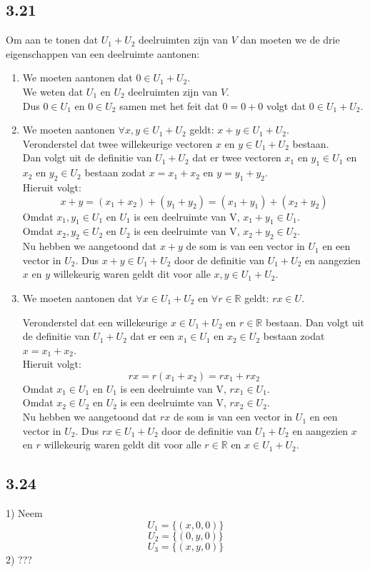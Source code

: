 \documentclass[lineaire_algebra_oplossingen.tex]{subfiles}
\begin{document}
\subsection*{3.21}
Om aan te tonen dat $U_1 + U_2$ deelruimten zijn van $V$ dan moeten we de drie eigenschappen van een deelruimte aantonen:
\begin{enumerate}
\item We moeten aantonen dat $0 \in U_1 + U_2$.\\
We weten dat $U_1$ en $U_2$ deelruimten zijn van $V$.\\
Dus $0 \in U_1$ en $0 \in U_2$ samen met het feit dat $0 = 0 + 0$ volgt dat $0 \in U_1 + U_2$.

\item We moeten aantonen $\forall x,y \in U_1 + U_2$ geldt: $x + y \in U_1 + U_2$.\\
Veronderstel dat twee willekeurige vectoren $x$ en $y \in U_1 + U_2$ bestaan.\\
Dan volgt uit de definitie van $U_1 + U_2$ dat er twee vectoren $x_1$ en $y_1 \in U_1$ en $x_2$ en $y_2 \in U_2$ bestaan zodat $x = x_1 + x_2$ en $y = y_1 + y_2$.\\
Hieruit volgt:
$$x + y = (x_1 + x_2) + (y_1 + y_2) = (x_1 + y_1) + (x_2 + y_2)$$
Omdat $x_1, y_1 \in U_1$ en $U_1$ is een deelruimte van V, $x_1 + y_1 \in U_1$.\\
Omdat $x_2, y_2 \in U_2$ en $U_2$ is een deelruimte van V, $x_2 + y_2 \in U_2$.\\
Nu hebben we aangetoond dat $x+y$ de som is van een vector in $U_1$ en een vector in $U_2$. 
Dus $x + y \in U_1 + U_2$ door de definitie van $U_1 + U_2$ en aangezien $x$ en $y$ willekeurig waren geldt dit voor alle $x,y \in U_1 + U_2$.

\item We moeten aantonen dat $\forall x \in U_1 + U_2$ en $\forall r \in \mathbb{R}$ geldt: $rx \in U$.

Veronderstel dat een willekeurige $x \in U_1 + U_2$ en $r \in \mathbb{R}$ bestaan. Dan volgt uit de definitie van $U_1 + U_2$ dat er een $x_1 \in U_1$ en $x_2 \in U_2$ bestaan zodat $x = x_1 + x_2$.\\
Hieruit volgt:
$$rx = r(x_1+x_2) = rx_1+rx_2$$
Omdat $x_1 \in U_1$ en $U_1$ is een deelruimte van V, $rx_1 \in U_1$.\\
Omdat $x_2 \in U_2$ en $U_2$ is een deelruimte van V, $rx_2 \in U_2$.\\
Nu hebben we aangetoond dat $rx$ de som is van een vector in $U_1$ en een vector in $U_2$. 
Dus $rx \in U_1 + U_2$ door de definitie van $U_1 + U_2$ en aangezien $x$ en $r$ willekeurig waren geldt dit voor alle $r \in \mathbb{R}$ en $x \in U_1 + U_2$.
\end{enumerate}
\subsection*{3.24}

1) 
Neem \\ 
$$U_1 = \{(x,0,0)\} $$
$$U_2 =  \{ (0,y,0)\} $$
$$U_3 = \{ (x,y,0)\} $$
2) ???
\end{document}
